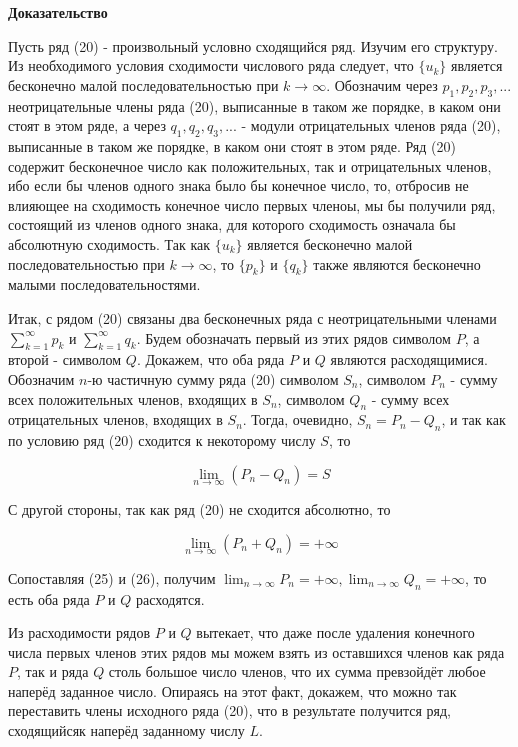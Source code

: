 \textbf{Доказательство}

Пусть ряд (20) - произвольный условно сходящийся ряд. Изучим его структуру. Из необходимого условия сходимости числового ряда следует, что $\{u_k\}$ является бесконечно малой последовательностью при $k \rightarrow \infty$. Обозначим  через $p_1, p_2, p_3, ...$ неотрицательные члены ряда (20), выписанные в таком же порядке, в каком они стоят в этом ряде, а через $q_1, q_2, q_3, ...$ - модули отрицательных членов ряда (20), выписанные в таком же порядке, в каком они стоят в этом ряде. Ряд (20) содержит бесконечное число как положительных, так и отрицательных членов, ибо если бы членов одного знака было бы конечное число, то, отбросив не влияющее на сходимость конечное число первых членоы, мы бы получили ряд, состоящий из членов одного знака, для которого сходимость означала бы абсолютную сходимость. Так как $\{u_k\}$ является бесконечно малой последовательностью при $k \rightarrow \infty$, то $\{p_k\}$ и $\{q_k\}$ также являются бесконечно малыми последовательностями.

Итак, с рядом (20) связаны два бесконечных ряда с неотрицательными членами {\small $\displaystyle\sum_{k = 1}^\infty p_k$} и {\small $\displaystyle\sum_{k = 1}^\infty q_k$}. Будем обозначать первый из этих рядов символом $P$, а второй - символом $Q$. Докажем, что оба ряда $P$ и $Q$ являются расходящимися. Обозначим $n$-ю частичную сумму ряда (20) символом $S_n$, символом $P_n$ - сумму всех положительных членов, входящих в $S_n$, символом $Q_n$ - сумму всех отрицательных членов, входящих в $S_n$. Тогда, очевидно, $S_n = P_n - Q_n$, и так как по условию ряд (20) сходится к некоторому числу $S$, то

\begin{equation}
	\displaystyle\lim_{n \rightarrow \infty} (P_n - Q_n) = S
\end{equation}

С другой стороны, так как ряд (20) не сходится абсолютно, то

\begin{equation}
	\displaystyle\lim_{n \rightarrow \infty} (P_n + Q_n) = + \infty
\end{equation}

Сопоставляя (25) и (26), получим {\small $\displaystyle\lim_{n \rightarrow \infty} P_n = +\infty, \displaystyle\lim_{n \rightarrow \infty} Q_n = +\infty$}, то есть оба ряда $P$ и $Q$ расходятся.

Из расходимости рядов $P$ и $Q$ вытекает, что даже после удаления конечного числа первых членов этих рядов мы можем взять из оставшихся членов как ряда $P$, так и ряда $Q$ столь большое число членов, что их сумма превзойдёт любое наперёд заданное число. Опираясь на этот факт, докажем, что можно так переставить члены исходного ряда (20), что в результате получится ряд, сходящийсяк наперёд заданному числу $L$.

